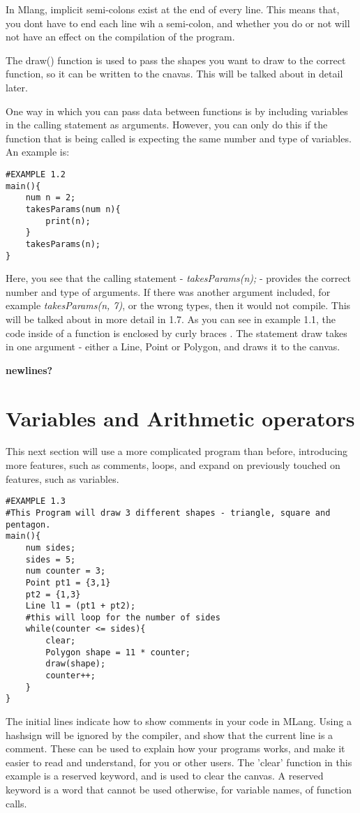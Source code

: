 \documentclass{l3proj}
\begin{document}
In Mlang, implicit semi-colons exist at the end of every line. This means that, you dont have to end each line wih a semi-colon, and whether you do or not will not have an effect on the compilation of the program. 

The draw() function is used to pass the shapes you want to draw to the correct function, so it can be written to the cnavas. This will be talked about in detail later.

One way in which you can pass data between functions is by including variables in the calling statement as arguments. However, you can only do this if the function that is being called is expecting the same number and type of variables. An example is:\\
\begin{lstlisting}
#EXAMPLE 1.2
main(){
	num n = 2;
	takesParams(num n){
		print(n);
	}
	takesParams(n);
}
\end{lstlisting}
Here, you see that the calling statement - \textit{takesParams(n);} - provides the correct number and type of arguments. If there was another argument included, for example \textit{takesParams(n, 7)}, or the wrong types, then it would not compile. This will be talked about in more detail in 1.7. As you can see in example 1.1, the code inside of a function is enclosed by curly braces {   }. The statement draw takes in one argument - either a Line, Point or Polygon, and draws it to the canvas.

\textbf{newlines?}

\section{Variables and Arithmetic operators}
\label{vars}
This next section will use a more complicated program than before, introducing more features, such as comments, loops, and expand on previously touched on features, such as variables.
\begin{lstlisting}
#EXAMPLE 1.3
#This Program will draw 3 different shapes - triangle, square and pentagon.
main(){
	num sides;
	sides = 5;
	num counter = 3;
	Point pt1 = {3,1}
	pt2 = {1,3}
	Line l1 = (pt1 + pt2);
	#this will loop for the number of sides
	while(counter <= sides){
		clear;
		Polygon shape =	11 * counter;
		draw(shape);
		counter++;
	}
}
\end{lstlisting}

The initial lines indicate how to show comments in your code in MLang. Using a hashsign will be ignored by the compiler, and show that the current line is a comment. These can be used to explain how your programs works, and make it easier to read and understand, for you or other users. The 'clear' function in this example is a reserved keyword, and is used to clear the canvas. A reserved keyword is a word that cannot be used otherwise, for variable names, of function calls.
\end{document}
